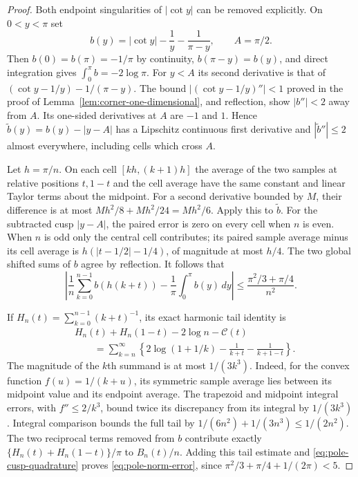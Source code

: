 \begin{proof}
Both endpoint singularities of $|\cot y|$ can be removed explicitly.
On $0<y<\pi$ set
\[
 b(y)=|\cot y|-\frac1y-\frac1{\pi-y},\qquad A=\pi/2.
\]
Then $b(0)=b(\pi)=-1/\pi$ by continuity,
$b(\pi-y)=b(y)$, and direct integration gives
$\int_0^\pi b=-2\log\pi$.  For $y<A$ its second derivative
is that of $(\cot y-1/y)-1/(\pi-y)$.  The bound
$|(\cot y-1/y)''|<1$ proved in the proof of
Lemma~\ref{lem:corner-one-dimensional}, and reflection, show
$|b''|<2$ away from $A$.  Its one-sided derivatives at $A$ are
$-1$ and $1$.  Hence $\widetilde b(y)=b(y)-|y-A|$ has a
Lipschitz continuous first derivative and $|\widetilde b''|\leq2$
almost everywhere, including cells which cross $A$.

Let $h=\pi/n$.  On each cell $[kh,(k+1)h]$ the average of the
two samples at relative positions $t,1-t$ and the cell average
have the same constant and linear Taylor terms about the midpoint.
For a second derivative bounded by $M$, their difference is at most
$Mh^2/8+Mh^2/24=Mh^2/6$.  Apply this to $\widetilde b$.
For the subtracted cusp $|y-A|$, the paired error is zero on every
cell when $n$ is even.  When $n$ is odd only the central cell contributes;
its paired sample average minus its cell average is
$h(|t-1/2|-1/4)$, of magnitude at most $h/4$.
The two global shifted sums of $b$ agree by reflection.  It follows that
\begin{equation}\label{eq:pole-cusp-quadrature}
 \left|\frac1n\sum_{k=0}^{n-1}b(h(k+t))
                 -\frac1\pi\int_0^\pi b(y)\,dy\right|
       \leq\frac{\pi^2/3+\pi/4}{n^2}.
\end{equation}

If $H_n(t)=\sum_{k=0}^{n-1}(k+t)^{-1}$, its exact harmonic
tail identity is
\begin{align*}
 &H_n(t)+H_n(1-t)-2\log n-\mathcal C(t)\\
 &\qquad=\sum_{k=n}^\infty
       \left\{2\log(1+1/k)-\frac1{k+t}-\frac1{k+1-t}\right\}.
\end{align*}
The magnitude of the $k$th summand is at most $1/(3k^3)$.
Indeed, for the convex function $f(u)=1/(k+u)$, its symmetric sample
average lies between its midpoint value and its endpoint average.
The trapezoid and midpoint integral errors, with $f''\leq2/k^3$,
bound twice its discrepancy from its integral by $1/(3k^3)$.
Integral comparison bounds the full tail by
$1/(6n^2)+1/(3n^3)\leq1/(2n^2)$.
The two reciprocal terms removed from $b$ contribute exactly
$\{H_n(t)+H_n(1-t)\}/\pi$ to $B_n(t)/n$.
Adding this tail estimate and \eqref{eq:pole-cusp-quadrature} proves
\eqref{eq:pole-norm-error}, since
$\pi^2/3+\pi/4+1/(2\pi)<5$.


\end{proof}
